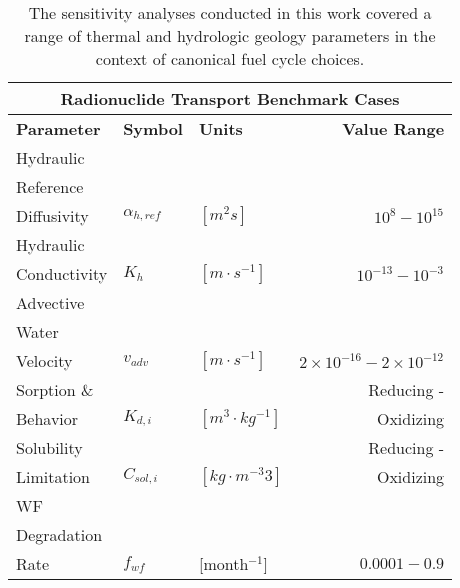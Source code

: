 
\begin{table}[ht!]
\centering
\footnotesize{
  \begin{tabularx}{\textwidth}{|X|l|l|r|}
\multicolumn{4}{c}{\textbf{Radionuclide Transport Benchmark Cases}}\\
\hline
\textbf{Parameter} & \textbf{Symbol} & \textbf{Units} & \textbf{Value Range} \\
\hline
Hydraulic & & & \\
Reference & & & \\
Diffusivity& $\alpha_{h,ref}$& $[m^2s]$ & $10^{8} - 10^{15}$ \\
\hline
Hydraulic & & & \\
Conductivity& $K_{h}$& $[m \cdot s^{-1}]$ & $10^{-13} - 10^{-3}$ \\
\hline
Advective  & & & \\
Water & & & \\
Velocity & $v_{adv}$ & $[m\cdot s^{-1}]$ & $2\times10^{-16}-2\times10^{-12}$ \\
\hline
Sorption \& & & & Reducing - \\
Behavior & $K_{d,i}$& $[m^3\cdot kg^{-1}]$ & Oxidizing \\
\hline
Solubility &  & & Reducing -\\
Limitation & $C_{sol,i}$ & $[kg\cdot m^{-3}3]$& Oxidizing \\
\hline
WF& & & \\
Degradation& & & \\
Rate& $f_{wf}$ & [month$^{-1}$]& $0.0001-0.9$ \\
\hline
\end{tabularx}
\caption{The sensitivity analyses conducted in this work covered a range of 
thermal and hydrologic geology parameters in the context of canonical fuel cycle choices.}
}
\label{tab:nuclide_bench_tab}
\end{table}

